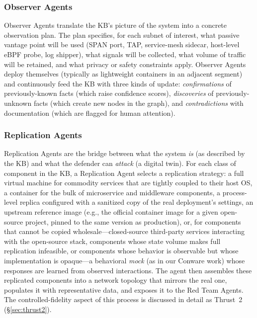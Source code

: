\subsubsection{Observer Agents}
Observer Agents translate the KB's picture of the system into a
concrete observation plan. The plan specifies, for each subnet of
interest, what passive vantage point will be used (SPAN port, TAP,
service-mesh sidecar, host-level eBPF probe, log shipper), what
signals will be collected, what volume of traffic will be retained,
and what privacy or safety constraints apply. Observer Agents deploy
themselves (typically as lightweight containers in an adjacent
segment) and continuously feed the KB with three kinds of update:
\emph{confirmations} of previously-known facts (which raise confidence
scores), \emph{discoveries} of previously-unknown facts (which create
new nodes in the graph), and \emph{contradictions} with documentation
(which are flagged for human attention).

\subsubsection{Replication Agents}
Replication Agents are the bridge between what the system \emph{is}
(as described by the KB) and what the defender can \emph{attack} (a
digital twin). For each class of component in the KB, a Replication
Agent selects a replication strategy: a full virtual machine for
commodity services that are tightly coupled to their host OS, a
container for the bulk of microservice and middleware components,
a process-level replica configured with a sanitized copy of the real
deployment's settings, an upstream reference image (e.g., the official
container image for a given open-source project, pinned to the same
version as production), or, for components that cannot be copied
wholesale---closed-source third-party services interacting with the
open-source stack, components whose state volume makes full replication
infeasible, or components whose behavior is observable but whose
implementation is opaque---a behavioral \emph{mock} (as in our Conware
work) whose responses are learned from observed interactions. The agent
then assembles these replicated components into a network topology that
mirrors the real one, populates it with representative data, and exposes
it to the Red Team Agents. The controlled-fidelity aspect of this
process is
discussed in detail as Thrust~2 (\S\ref{sec:thrust2}).

